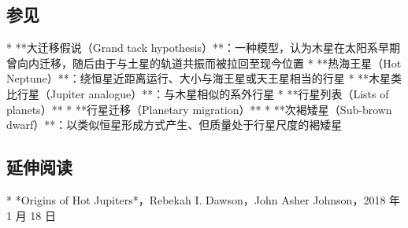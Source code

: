 \subsection{参见}

* **大迁移假说（Grand tack hypothesis）**：一种模型，认为木星在太阳系早期曾向内迁移，随后由于与土星的轨道共振而被拉回至现今位置
* **热海王星（Hot Neptune）**：绕恒星近距离运行、大小与海王星或天王星相当的行星
* **木星类比行星（Jupiter analogue）**：与木星相似的系外行星
* **行星列表（Lists of planets）**
* **行星迁移（Planetary migration）**
* **次褐矮星（Sub-brown dwarf）**：以类似恒星形成方式产生、但质量处于行星尺度的褐矮星
\subsection{延伸阅读}

* *Origins of Hot Jupiters*，Rebekah I. Dawson，John Asher Johnson，2018 年 1 月 18 日
